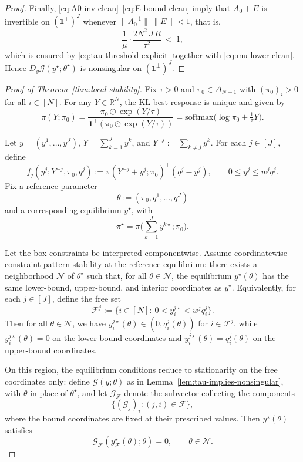 \documentclass{article}
\begin{document}
\begin{proof}
Finally, \eqref{eq:A0-inv-clean}--\eqref{eq:E-bound-clean} imply that \(A_0+E\) is invertible on \((\mathbf 1^\perp)^J\)
whenever \(\|A_0^{-1}\|\,\|E\|<1\), that is,
\[
\frac{1}{\mu}\cdot \frac{2N^2\,J\,R}{\tau^2}\ <\ 1,
\]
which is ensured by \eqref{eq:tau-threshold-explicit} together with \eqref{eq:mu-lower-clean}. Hence
\(D_y\mathcal{G}(y^\star;\theta^\star)\) is nonsingular on \((\mathbf 1^\perp)^J\).
\end{proof}

\begin{proof}[Proof of Theorem~\ref{thm:local-stability}]
Fix \(\tau>0\) and \(\pi_0\in\Delta_{N-1}\) with \((\pi_0)_i>0\) for all \(i\in[N]\).
For any \(Y\in\mathbb{R}^N\), the KL best response is unique and given by
\[
\pi(Y;\pi_0)
=
\frac{\pi_0\odot \exp(Y/\tau)}
{\mathbf{1}^\top(\pi_0\odot \exp(Y/\tau))}
=
\mathrm{softmax}\!\Big(\log\pi_0+\tfrac{1}{\tau}Y\Big).
\]

Let \(y=(y^1,\dots,y^J)\), \(Y=\sum_{k=1}^J y^k\), and \(Y^{-j}:=\sum_{k\neq j}y^k\).
For each \(j\in[J]\), define
\[
f_j(y^j;Y^{-j},\pi_0,q^j)
:=\pi(Y^{-j}+y^j;\pi_0)^\top(q^j-y^j),
\qquad 0\le y^j\le w^jq^j.
\]
Fix a reference parameter
\[
\theta:=(\pi_0,q^{1},\dots,q^{J})
\]
and a corresponding equilibrium \(y^\star\), with
\[
\pi^\star=\pi\!\Big(\sum_{k=1}^J y^{k\star};\pi_0\Big).
\]

Let the box constraints be interpreted componentwise.
Assume coordinatewise constraint-pattern stability at the reference equilibrium: there exists a neighborhood \(\mathcal N\) of \(\theta^\star\)
such that, for all \(\theta\in\mathcal N\), the equilibrium \(y^\star(\theta)\) has the same lower-bound, upper-bound, and interior coordinates as \(y^\star\).
Equivalently, for each \(j\in[J]\), define the free set
\[
\mathcal F^j:=\{i\in[N]:\ 0<y_i^{j\star}<w^jq_i^{j}\}.
\]
Then for all \(\theta\in\mathcal N\), we have \(y_i^{j\star}(\theta)\in(0,q_i^j(\theta))\) for \(i\in\mathcal F^j\),
while \(y_i^{j\star}(\theta)=0\) on the lower-bound coordinates and \(y_i^{j\star}(\theta)=q_i^j(\theta)\) on the upper-bound coordinates.

On this region, the equilibrium conditions reduce to stationarity on the free coordinates only: define \(\mathcal G(y;\theta)\) as in Lemma~\ref{lem:tau-implies-nonsingular}, with \(\theta\) in place of \(\theta^\star\), and let \(\mathcal G_{\mathcal F}\) denote the subvector collecting the components
\[
\{(\mathcal G_j)_i:(j,i)\in\mathcal F\},
\]
where the bound coordinates are fixed at their prescribed values.
Then \(y^\star(\theta)\) satisfies
\begin{equation}
\label{eq:reduced-system}
\mathcal G_{\mathcal F}(y^\star_{\mathcal F}(\theta);\theta)=0,
\qquad \theta\in\mathcal N.
\end{equation}


\end{proof}
\end{document}
